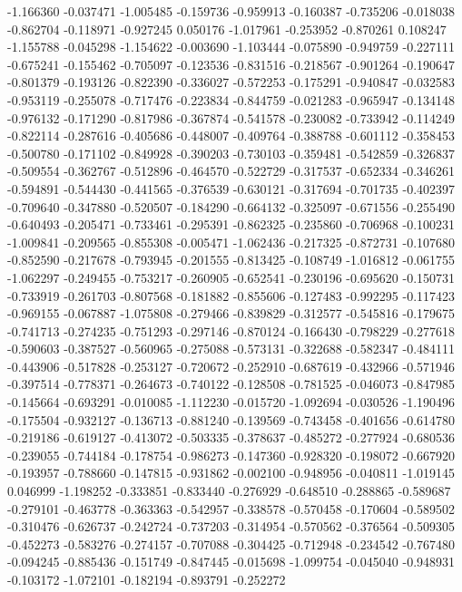 -1.166360
-0.037471
-1.005485
-0.159736
-0.959913
-0.160387
-0.735206
-0.018038
-0.862704
-0.118971
-0.927245
0.050176
-1.017961
-0.253952
-0.870261
0.108247
-1.155788
-0.045298
-1.154622
-0.003690
-1.103444
-0.075890
-0.949759
-0.227111
-0.675241
-0.155462
-0.705097
-0.123536
-0.831516
-0.218567
-0.901264
-0.190647
-0.801379
-0.193126
-0.822390
-0.336027
-0.572253
-0.175291
-0.940847
-0.032583
-0.953119
-0.255078
-0.717476
-0.223834
-0.844759
-0.021283
-0.965947
-0.134148
-0.976132
-0.171290
-0.817986
-0.367874
-0.541578
-0.230082
-0.733942
-0.114249
-0.822114
-0.287616
-0.405686
-0.448007
-0.409764
-0.388788
-0.601112
-0.358453
-0.500780
-0.171102
-0.849928
-0.390203
-0.730103
-0.359481
-0.542859
-0.326837
-0.509554
-0.362767
-0.512896
-0.464570
-0.522729
-0.317537
-0.652334
-0.346261
-0.594891
-0.544430
-0.441565
-0.376539
-0.630121
-0.317694
-0.701735
-0.402397
-0.709640
-0.347880
-0.520507
-0.184290
-0.664132
-0.325097
-0.671556
-0.255490
-0.640493
-0.205471
-0.733461
-0.295391
-0.862325
-0.235860
-0.706968
-0.100231
-1.009841
-0.209565
-0.855308
-0.005471
-1.062436
-0.217325
-0.872731
-0.107680
-0.852590
-0.217678
-0.793945
-0.201555
-0.813425
-0.108749
-1.016812
-0.061755
-1.062297
-0.249455
-0.753217
-0.260905
-0.652541
-0.230196
-0.695620
-0.150731
-0.733919
-0.261703
-0.807568
-0.181882
-0.855606
-0.127483
-0.992295
-0.117423
-0.969155
-0.067887
-1.075808
-0.279466
-0.839829
-0.312577
-0.545816
-0.179675
-0.741713
-0.274235
-0.751293
-0.297146
-0.870124
-0.166430
-0.798229
-0.277618
-0.590603
-0.387527
-0.560965
-0.275088
-0.573131
-0.322688
-0.582347
-0.484111
-0.443906
-0.517828
-0.253127
-0.720672
-0.252910
-0.687619
-0.432966
-0.571946
-0.397514
-0.778371
-0.264673
-0.740122
-0.128508
-0.781525
-0.046073
-0.847985
-0.145664
-0.693291
-0.010085
-1.112230
-0.015720
-1.092694
-0.030526
-1.190496
-0.175504
-0.932127
-0.136713
-0.881240
-0.139569
-0.743458
-0.401656
-0.614780
-0.219186
-0.619127
-0.413072
-0.503335
-0.378637
-0.485272
-0.277924
-0.680536
-0.239055
-0.744184
-0.178754
-0.986273
-0.147360
-0.928320
-0.198072
-0.667920
-0.193957
-0.788660
-0.147815
-0.931862
-0.002100
-0.948956
-0.040811
-1.019145
0.046999
-1.198252
-0.333851
-0.833440
-0.276929
-0.648510
-0.288865
-0.589687
-0.279101
-0.463778
-0.363363
-0.542957
-0.338578
-0.570458
-0.170604
-0.589502
-0.310476
-0.626737
-0.242724
-0.737203
-0.314954
-0.570562
-0.376564
-0.509305
-0.452273
-0.583276
-0.274157
-0.707088
-0.304425
-0.712948
-0.234542
-0.767480
-0.094245
-0.885436
-0.151749
-0.847445
-0.015698
-1.099754
-0.045040
-0.948931
-0.103172
-1.072101
-0.182194
-0.893791
-0.252272
